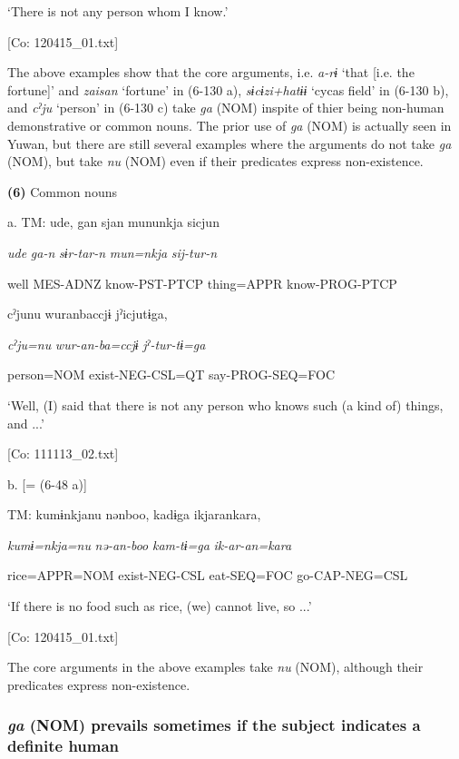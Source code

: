       ‘There is not any person whom I know.’

      [Co: 120415\_01.txt]

The above examples show that the core arguments, i.e. \textit{a-rɨ} ‘that [i.e. the fortune]’ and \textit{zaisan} ‘fortune’ in (6-130 a), \textit{sɨcɨzi+hatɨɨ} ‘cycas field’ in (6-130 b), and \textit{cˀju} ‘person’ in (6-130 c) take \textit{ga} (NOM) inspite of thier being non-human demonstrative or common nouns. The prior use of \textit{ga} (NOM) is actually seen in Yuwan, but there are still several examples where the arguments do not take \textit{ga} (NOM), but take \textit{nu} (NOM) even if their predicates express non-existence.

\textbf{(6)}  Common nouns

  a.  TM:  ude,  gan  sjan  mununkja  sicjun

      \textit{ude}  \textit{ga-n}  \textit{sɨr-tar-n}  \textit{mun=nkja}  \textit{sij-tur-n}

      well  MES-ADNZ  know-PST-PTCP  thing=APPR  know-PROG-PTCP

      cˀjunu  wuranbaccjɨ  jˀicjutɨga,

      \textit{cˀju=nu}  \textit{wur-an-ba=ccjɨ}  \textit{jˀ-tur-tɨ=ga}

      person=NOM  exist-NEG-CSL=QT  say-PROG-SEQ=FOC

      ‘Well, (I) said that there is not any person who knows such (a kind of) things, and ...’

      [Co: 111113\_02.txt]

  b.  [= (6-48 a)]

    TM:  kumɨnkjanu  nənboo,  kadɨga  ikjarankara,

      \textit{kumɨ=nkja=nu}  \textit{nə-an-boo}  \textit{kam-tɨ=ga}  \textit{ik-ar-an=kara}

      rice=APPR=NOM  exist-NEG-CSL  eat-SEQ=FOC  go-CAP-NEG=CSL

      ‘If there is no food such as rice, (we) cannot live, so ...’

      [Co: 120415\_01.txt]

The core arguments in the above examples take \textit{nu} (NOM), although their predicates express non-existence.

\subsubsection{\textit{ga} (NOM) prevails sometimes if the subject indicates a definite human}

